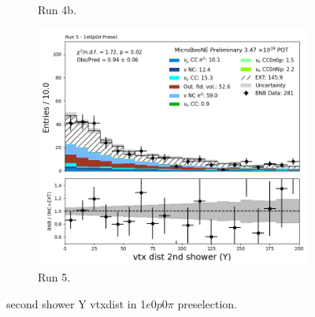 \begin{figure}[H]
\begin{subfigure}[t]{0.32\linewidth}
        \caption{Run 4b.}
    \end{subfigure}%
    \hspace{0.2cm}%
    \begin{subfigure}[t]{0.32\linewidth}
        \includegraphics[width=\linewidth]{technote/Appendix_Preselection/Figures/1e0p0pi/Run5/secondshower_Y_vtxdist_Run5_1e0p0pi_Presel.png}
        \caption{Run 5.}
    \end{subfigure}
    \caption{second shower Y vtxdist in 1$e$0$p$0$\pi$ preselection.}
\end{figure}


